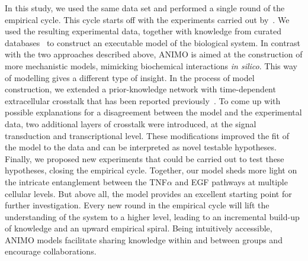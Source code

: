 In this study, we used the same data set and performed a single round of the empirical cycle. This cycle starts off with the experiments carried out by~\citet{pathway-compendium}. We used the resulting experimental data, together with knowledge from curated databases~\citep{kegg,phosphosite} to construct an executable model of the biological system.
In contrast with the two approaches described above, ANIMO is aimed at the construction of
more mechanistic models, mimicking biochemical interactions \emph{in silico}. This way of modelling
gives a different type of insight. In the process of model construction, we extended a
prior-knowledge network with time-dependent extracellular crosstalk that has been reported
previously~\citep{pathway-autocrine}. To come up with possible explanations for a disagreement
between the model and the experimental data, two additional layers of
crosstalk were introduced, at the signal transduction and transcriptional level. These modifications 
improved the fit of the model to the data and can be interpreted as novel testable hypotheses.
Finally, we proposed new experiments that could be carried out to test these hypotheses, closing the empirical cycle. 
Together, our model sheds more light on the intricate
entanglement between the TNF$\alpha$ and EGF pathways at multiple cellular levels.
But above all,  the model provides an excellent starting point for further investigation.
Every new round in the empirical cycle will lift the understanding of the system to a higher level, leading to an incremental build-up of knowledge and an upward empirical spiral. Being intuitively accessible, ANIMO models facilitate sharing knowledge within and between groups and encourage collaborations.
